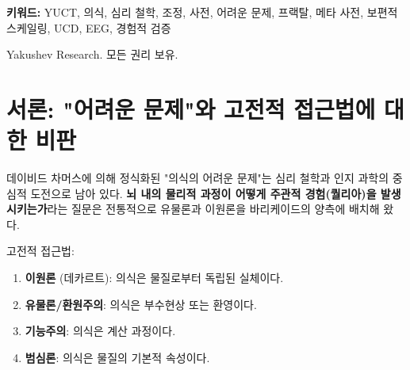 \documentclass[12pt,a4paper]{article}
\DeclareRobustCommand{\alD}{\texorpdfstring{\ensuremath{\alpha_{\mathrm{D}}}}{alpha_D}}
\DeclareRobustCommand{\beI}{\texorpdfstring{\ensuremath{\beta_{\mathrm{I}}}}{beta_I}}
\DeclareRobustCommand{\gaR}{\texorpdfstring{\ensuremath{\gamma_{\mathrm{R}}}}{gamma_R}}
\newcommand{\eff}{\mathrm{eff}}
\newcommand{\Ke}{K_{\eff}}
\begin{document}
\begin{titlepage}
\begin{center}
\begin{abstract}
				결정적으로 중요한 것은, 이 철학적 틀이 50자릿수 이상의 규모에 걸쳐 검증된 보편적 법칙 \(\varepsilon = \kappa_c \alpha \Ke^{-\beta}\) (\(\beta = 0.67\)) (부록 L)에 기반하고 있으며, 6개의 과학 영역에서 독립적으로 확인되었다는 점이다: 물리학(중력파, GWTC-4.0), 천체물리학(백색왜성, 26,041 천체), 지구물리학(지구-달 계), 화학(873 결합 에너지), 생물학(68 척추동물 게놈), 신경과학(의식의 EEG 상관, UCD 파라미터). 특히, 부록 H에서 도입된 보편적 의식 서술자(UCD)는 의식 상태와 상관되며 동일한 스케일링 법칙을 따르는 정량적 척도 \(\alD, \beI, \gaR\)를 제공한다.
				
				철학적 함의에는 다음이 포함된다: (1) 환원주의 없는 의식의 자연화; (2) 조정 사전의 복잡성 성장으로서의 마음의 진화에 대한 새로운 이해; (3) 비인간중심적 의식 형태(인공적, 집단적, 행성적)의 가능성; (4) 우주론적 조정의 한계로서의 암흑 물질/암흑 에너지와의 연결. YUCT는 "어려운 문제"의 해결책뿐만 아니라, 신경과학, 물리학, 인문학 사이의 대화를 위한 통합된 철학적 플랫폼을 제공하며, 이것이 이제 경험적으로 검증되었다.
			\end{abstract}
			
			\vspace{0cm}
			
			\noindent
			\small\textbf{키워드:} YUCT, 의식, 심리 철학, 조정, 사전, 어려운 문제, 프랙탈, 메타 사전, 보편적 스케일링, UCD, EEG, 경험적 검증
			
			\vspace{0.5cm}
			
			\noindent
			 Yakushev Research. 모든 권리 보유.
		\end{center}
	\end{titlepage}
	
	\tableofcontents
	
	\newpage
	
	\section{서론: "어려운 문제"와 고전적 접근법에 대한 비판}
	
	데이비드 차머스에 의해 정식화된 "의식의 어려운 문제"는 심리 철학과 인지 과학의 중심적 도전으로 남아 있다. \textbf{뇌 내의 물리적 과정이 어떻게 주관적 경험(퀄리아)을 발생시키는가}라는 질문은 전통적으로 유물론과 이원론을 바리케이드의 양측에 배치해 왔다.
	
	고전적 접근법:
	\begin{enumerate}
		\item \textbf{이원론} (데카르트): 의식은 물질로부터 독립된 실체이다.
		\item \textbf{유물론/환원주의}: 의식은 부수현상 또는 환영이다.
		\item \textbf{기능주의}: 의식은 계산 과정이다.
		\item \textbf{범심론}: 의식은 물질의 기본적 속성이다.
	\end{enumerate}
	
\end{document}
